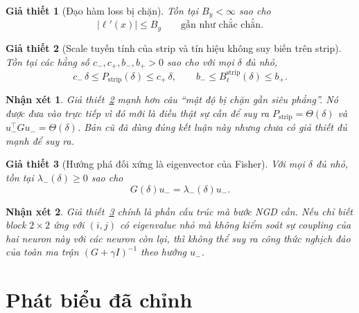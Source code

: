 \documentclass[11pt,a4paper]{article}
\newtheorem{assumption}{Giả thiết}
\newtheorem{remark}{Nhận xét}
\newcommand{\abs}[1]{\left\lvert #1 \right\rvert}
\begin{document}
\begin{assumption}[Đạo hàm loss bị chặn]
Tồn tại $B_y < \infty$ sao cho
\[
\abs{\ell'(x)} \le B_y
\qquad \text{gần như chắc chắn.}
\]
\end{assumption}

\begin{assumption}[Scale tuyến tính của strip và tín hiệu không suy biến trên strip]
\label{ass:strip_scaling}
Tồn tại các hằng số $c_-, c_+, b_-, b_+ > 0$ sao cho với mọi $\delta$ đủ nhỏ,
\[
c_-\,\delta \le P_{\mathrm{strip}}(\delta) \le c_+\,\delta,
\qquad
b_- \le B_\ell^{\mathrm{strip}}(\delta) \le b_+.
\]
\end{assumption}

\begin{remark}
Giả thiết~\ref{ass:strip_scaling} mạnh hơn câu ``mật độ bị chặn gần siêu phẳng''.
Nó được đưa vào trực tiếp vì đó mới là điều thật sự cần để suy ra
$P_{\mathrm{strip}} = \Theta(\delta)$ và $u_-^\top G u_- = \Theta(\delta)$.
Bản cũ đã dùng đúng kết luận này nhưng chưa có giả thiết đủ mạnh để suy ra.
\end{remark}

\begin{assumption}[Hướng phá đối xứng là eigenvector của Fisher]
\label{ass:eigenvector}
Với mọi $\delta$ đủ nhỏ, tồn tại $\lambda_-(\delta) \ge 0$ sao cho
\[
G(\delta) u_- = \lambda_-(\delta) u_-.
\]
\end{assumption}

\begin{remark}
Giả thiết~\ref{ass:eigenvector} chính là phần cấu trúc mà bước NGD cần. Nếu chỉ
biết block $2\times 2$ ứng với $(i,j)$ có eigenvalue nhỏ mà không kiểm soát sự
coupling của hai neuron này với các neuron còn lại, thì không thể suy ra công
thức nghịch đảo của toàn ma trận $(G+\gamma I)^{-1}$ theo hướng $u_-$.
\end{remark}

\section{Phát biểu đã chỉnh}
\end{document}

